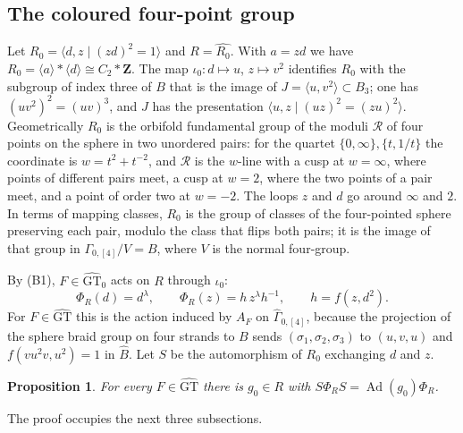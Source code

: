 \documentclass[11pt,a4paper]{article}
\theoremstyle{plain}
\newtheorem{proposition}[theorem]{Proposition}
\theoremstyle{definition}
\theoremstyle{remark}
\newcommand{\GT}{\widehat{\mathrm{GT}}}
\newcommand{\GTz}{\widehat{\mathrm{GT}}_0}
\newcommand{\Z}{\mathbf Z}
\newcommand{\Bh}{\widehat B}
\newcommand{\Gh}{\widehat\Gamma}
\newcommand{\Ad}{\operatorname{Ad}}
\begin{document}
\subsection*{The coloured four-point group}
Let $R_0=\langle d,z\mid(zd)^2=1\rangle$ and $R=\widehat{R_0}$. With $a=zd$ we have
$R_0=\langle a\rangle*\langle d\rangle\cong C_2*\Z$. The map $\iota_0:d\mapsto u$, $z\mapsto v^2$ identifies $R_0$
with the subgroup of index three of $B$ that is the image of $J=\langle u,v^2\rangle\subset B_3$; one has
$(uv^2)^2=(uv)^3$, and $J$ has the presentation $\langle u,z\mid(uz)^2=(zu)^2\rangle$. Geometrically $R_0$ is the
orbifold fundamental group of the moduli $\mathcal R$ of four points on the sphere in two unordered pairs: for
the quartet $\{0,\infty\},\{t,1/t\}$ the coordinate is $w=t^2+t^{-2}$, and $\mathcal R$ is the $w$-line with a cusp
at $w=\infty$, where points of different pairs meet, a cusp at $w=2$, where the two points of a pair meet, and a
point of order two at $w=-2$. The loops $z$ and $d$ go around $\infty$ and $2$. In terms of mapping classes, $R_0$
is the group of classes of the four-pointed sphere preserving each pair, modulo the class that flips both pairs;
it is the image of that group in $\Gamma_{0,[4]}/V=B$, where $V$ is the normal four-group.

By (B1), $F\in\GTz$ acts on $R$ through $\iota_0$:
\[
 \Phi_R(d)=d^\lambda,\qquad \Phi_R(z)=h\,z^\lambda h^{-1},\qquad h=f(z,d^2).
\]
For $F\in\GT$ this is the action induced by $A_F$ on $\Gh_{0,[4]}$, because the projection of the sphere braid
group on four strands to $B$ sends $(\sigma_1,\sigma_2,\sigma_3)$ to $(u,v,u)$ and $f(vu^2v,u^2)=1$ in $\Bh$. Let
$S$ be the automorphism of $R_0$ exchanging $d$ and $z$.

\begin{proposition}\label{prop:swap}
For every $F\in\GT$ there is $g_0\in R$ with $S\Phi_RS=\Ad(g_0)\Phi_R$.
\end{proposition}

The proof occupies the next three subsections.
\end{document}
